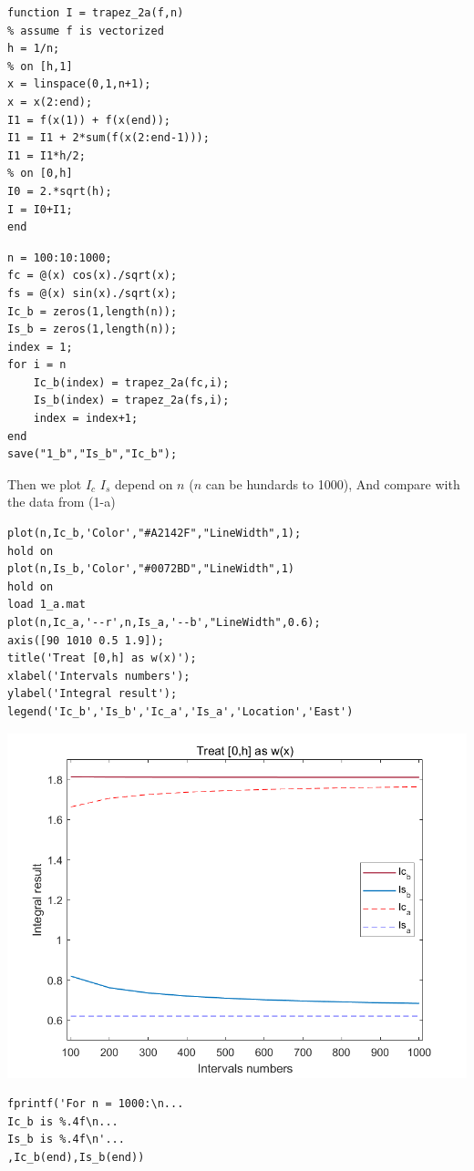 \documentclass{article}
\begin{document}
\begin{flushleft}
\begin{enumerate}
\begin{framed}
\begin{multicols}{2}
\begin{verbatim}
function I = trapez_2a(f,n)
% assume f is vectorized
h = 1/n;
% on [h,1]
x = linspace(0,1,n+1);
x = x(2:end);
I1 = f(x(1)) + f(x(end));
I1 = I1 + 2*sum(f(x(2:end-1)));
I1 = I1*h/2;
% on [0,h]
I0 = 2.*sqrt(h);
I = I0+I1;
end
\end{verbatim}
\columnbreak
\begin{verbatim}
n = 100:10:1000;
fc = @(x) cos(x)./sqrt(x);
fs = @(x) sin(x)./sqrt(x);
Ic_b = zeros(1,length(n));
Is_b = zeros(1,length(n));
index = 1;
for i = n
    Ic_b(index) = trapez_2a(fc,i);
    Is_b(index) = trapez_2a(fs,i);
    index = index+1;
end
save("1_b","Is_b","Ic_b");
\end{verbatim}
\end{multicols}
Then we plot \(I_{c}\) \(I_{s}\) depend on \(n\) (\(n\) can be hundards to 1000), And compare with the data from (1-a)
\begin{verbatim}
plot(n,Ic_b,'Color',"#A2142F","LineWidth",1);
hold on
plot(n,Is_b,'Color',"#0072BD","LineWidth",1)
hold on
load 1_a.mat
plot(n,Ic_a,'--r',n,Is_a,'--b',"LineWidth",0.6);
axis([90 1010 0.5 1.9]);
title('Treat [0,h] as w(x)');
xlabel('Intervals numbers');
ylabel('Integral result');
legend('Ic_b','Is_b','Ic_a','Is_a','Location','East')
\end{verbatim}
\begin{multicols}{2}
\includegraphics[width={\linewidth}]{Q1_b.png}
\columnbreak
\begin{verbatim}
fprintf('For n = 1000:\n...
Ic_b is %.4f\n...
Is_b is %.4f\n'...
,Ic_b(end),Is_b(end))

\end{verbatim}
\end{multicols}
\end{framed}
\end{enumerate}
\end{flushleft}
\end{document}
